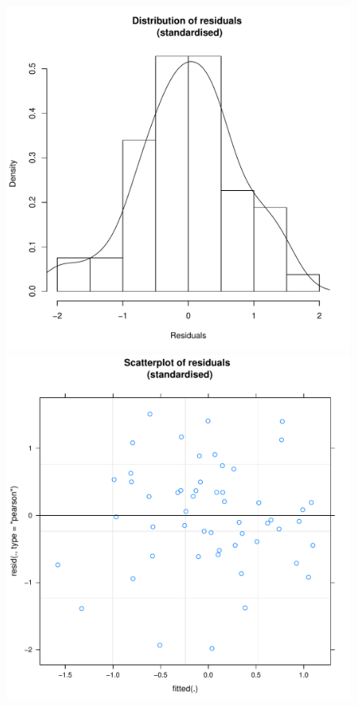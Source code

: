 \begin{CJK}{UTF8}{gbsn}


\begin{figure}[!htbp]
\includegraphics[scale =.4]{images/TEM21Hist.pdf}
   \includegraphics[scale =.4]{images/TEM21Scatter.pdf}

\end{figure}
\end{CJK}
